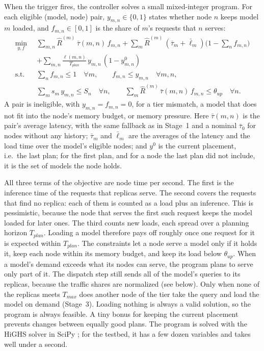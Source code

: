 When the trigger fires, the controller solves a small mixed-integer program.
For each eligible (model, node) pair, $y_{m,n} \in \{0, 1\}$ states whether node $n$ keeps model $m$ loaded, and $f_{m,n} \in [0, 1]$ is the share of $m$'s requests that $n$ serves:
$$ \begin{aligned} \min_{y, f} \;\; & \sum_{m, n} \hat{R}^{(m)} \, \bar{\tau}(m, n) \, f_{m,n} + \sum_{m} \hat{R}^{(m)} \, (\bar{\tau}_m + \bar{\ell}_m) \Big( 1 - \sum_{n} f_{m,n} \Big) \\ & + \sum_{m, n} \frac{\ell(m, n)}{T_{plan}} \, y_{m,n} \, (1 - y^0_{m,n}) \\ \text{s.t.} \;\; & \sum_{n} f_{m,n} \le 1 \quad \forall m, \qquad f_{m,n} \le y_{m,n} \quad \forall m, n, \\ & \sum_{m} s_m \, y_{m,n} \le S_n \quad \forall n, \qquad \sum_{m} \hat{R}^{(m)} \, \bar{\tau}(m, n) \, f_{m,n} \le \theta_{up} \quad \forall n. \end{aligned} $$
A pair is ineligible, with $y_{m,n} = f_{m,n} = 0$, for a tier mismatch, a model that does not fit into the node's memory budget, or memory pressure.
Here $\bar{\tau}(m, n)$ is the pair's average latency, with the same fallback as in Stage~1 and a nominal $\bar{\tau}_0$ for nodes without any history;
$\bar{\tau}_m$ and $\bar{\ell}_m$ are the averages of the latency and the load time over the model's eligible nodes;
and $y^0$ is the current placement, i.e.\ the last plan; for the first plan, and for a node the last plan did not include, it is the set of models the node holds.

All three terms of the objective are node time per second.
The first is the inference time of the requests that replicas serve.
The second covers the requests that find no replica: each of them is counted as a load plus an inference.
This is pessimistic, because the node that serves the first such request keeps the model loaded for later ones.
The third counts new loads, each spread over a planning horizon $T_{plan}$.
Loading a model therefore pays off roughly once one request for it is expected within $T_{plan}$.
The constraints let a node serve a model only if it holds it, keep each node within its memory budget, and keep its load below $\theta_{up}$.
When a model's demand exceeds what its nodes can serve, the program plans to serve only part of it.
The dispatch step still sends all of the model's queries to its replicas, because the traffic shares are normalized (see below).
Only when none of the replicas meets $T_{max}$ does another node of the tier take the query and load the model on demand (Stage~3).
Loading nothing is always a valid solution, so the program is always feasible.
A tiny bonus for keeping the current placement prevents changes between equally good plans.
The program is solved with the HiGHS solver \cite{highs} in SciPy \cite{scipy}; for the testbed, it has a few dozen variables and takes well under a second.

